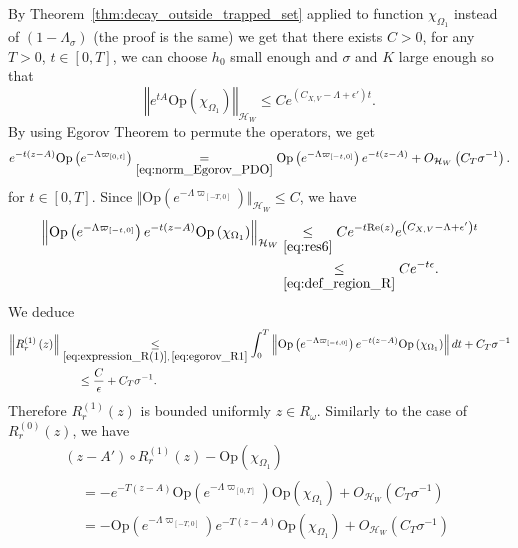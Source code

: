 \documentclass[AHL,Unicode,longabstracts,published]{cedram}
\newcommand{\clH}{\mathcal{H}}
\newcommand{\Ree}{\mathrm{Re}}
\newcommand{\Opp}{\mathrm{Op}}
\newcommand{\Ree}{\mathrm{Re}}
\newcommand{\clH}{\mathcal{H}}
\begin{document}
\pagebreak

By Theorem~\eqref{thm:decay_outside_trapped_set} applied to function $\chi_{\Omega_{1}}$ instead of $(1-\Lambda_{\sigma})$ (the proof is the same) we get that there exists $C>0$, for any $T>0$, $t\in[0,T]$, we can choose $h_{0}$ small enough and $\sigma$ and $K$ large enough so that
\begin{equation}\label{eq:res6}
\left\Vert e^{tA}\Opp \left(\chi_{\Omega_{1}}\right)\right\Vert _{\clH _{W}}\leq Ce^{\left(C_{X,V}-\Lambda+\epsilon'\right)t}.
\end{equation}
By using Egorov Theorem to permute the operators, we get
\begin{equation}\label{eq:egorov_R1}
e^{-t\left(z-A\right)}\Opp \left(e^{-\Lambda\varpi_{\left[0,t\right]}}\right)\underset{\eqref{eq:norm_Egorov_PDO}}{=}\Opp \left(e^{-\Lambda\varpi_{\left[-t,0\right]}}\right)e^{-t\left(z-A\right)}+O_{\clH _{W}}\left(C_{T}\sigma^{-1}\right).
\end{equation}
for $t\in[0,T]$. Since $\Vert \Opp (e^{-\Lambda\varpi_{[-T,0]}})\Vert _{\clH _{W}}\leq C$, we have
\begin{equation}\label{eq:res55}
\begin{split}
\left\Vert \Opp \left(e^{-\Lambda\varpi_{\left[-t,0\right]}}\right)e^{-t\left(z-A\right)}\Opp \left(\chi_{\Omega_{1}}\right)\right\Vert _{\clH _{W}} & \underset{\eqref{eq:res6}}{\leq}Ce^{-t\Ree\left(z\right)}e^{\left(C_{X,V}-\Lambda+\epsilon'\right)t}\\
& \underset{\eqref{eq:def_region_R}}{\leq}Ce^{-t\epsilon}.
\end{split}
\end{equation}
We deduce
\begin{align*}
\left\Vert R_{r}^{\left(1\right)}\left(z\right)\right\Vert & \underset{\eqref{eq:expression_R(1)},\,\eqref{eq:egorov_R1}}{\leq}\int_{0}^{T}\left\Vert \Opp \left(e^{-\Lambda\varpi_{\left[-t,0\right]}}\right)e^{-t\left(z-A\right)}\Opp \left(\chi_{\Omega_{1}}\right)\right\Vert dt+C_{T}\sigma^{-1}\\
& \mkern28mu\leq\frac{C}{\epsilon}+C_{T}\sigma^{-1}.
\end{align*}
Therefore $R_{r}^{(1)}(z)$ is bounded uniformly $z\in R_{\omega}$. Similarly to the case of $R_{r}^{(0)}(z)$, we have
\begin{multline}\label{eq:ress}
\left(z-A'\right)\circ R_{r}^{\left(1\right)}\left(z\right)-\Opp \left(\chi_{\Omega_{1}}\right)\\
\begin{aligned}
&= -e^{-T\left(z-A\right)}\Opp \left(e^{-\Lambda\varpi_{\left[0,T\right]}}\right)\Opp \left(\chi_{\Omega_{1}}\right)+O_{\clH _{W}}\left(C_{T}\sigma^{-1}\right)\\
&=  -\Opp \left(e^{-\Lambda\varpi_{\left[-T,0\right]}}\right)e^{-T\left(z-A\right)}\Opp \left(\chi_{\Omega_{1}}\right)+O_{\clH _{W}}\left(C_{T}\sigma^{-1}\right)
\end{aligned}
\end{multline}
\end{document}
